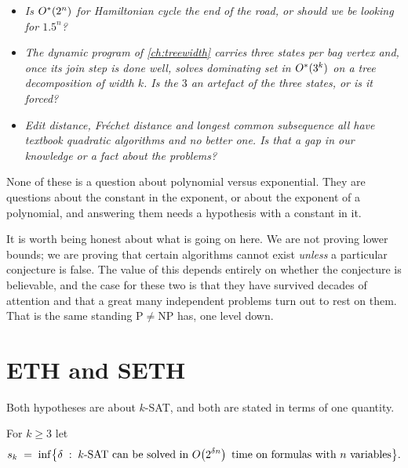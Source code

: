 \begin{itemize}[leftmargin=*]
  \item \emph{Is $O^{*}{}(2^n)$ for Hamiltonian cycle the end of the road, or
        should we be looking for $1.5^n$?}
  \item \emph{The dynamic program of \cref{ch:treewidth} carries three states
        per bag vertex and, once its join step is done well, solves dominating
        set in $O^{*}{}(3^k)$ on a tree decomposition of width $k$. Is the $3$
        an artefact of the three states, or is it forced?}
  \item \emph{Edit distance, Fr\'echet distance and longest common subsequence
        all have textbook quadratic algorithms and no better one. Is that a gap
        in our knowledge or a fact about the problems?}
\end{itemize}

None of these is a question about polynomial versus exponential. They are
questions about the constant in the exponent, or about the exponent of a
polynomial, and answering them needs a hypothesis with a constant in it.

\begin{intuition}
It is worth being honest about what is going on here. We are not proving lower
bounds; we are proving that certain algorithms cannot exist \emph{unless} a
particular conjecture is false. The value of this depends entirely on whether
the conjecture is believable, and the case for these two is that they have
survived decades of attention and that a great many independent problems turn
out to rest on them. That is the same standing $\mathrm{P} \ne \mathrm{NP}$
has, one level down.
\end{intuition}

\section{ETH and SETH}
\label{sec:eth-seth}

Both hypotheses are about $k$-SAT, and both are stated in terms of one
quantity.

\begin{definition}\label{def:sk}
For $k \ge 3$ let
\[ s_k \;=\; \inf\bigl\{ \delta \;:\; \text{$k$-SAT can be solved in }
   O\!\left(2^{\delta n}\right) \text{ time on formulas with $n$ variables} \bigr\}. \]
\end{definition}

